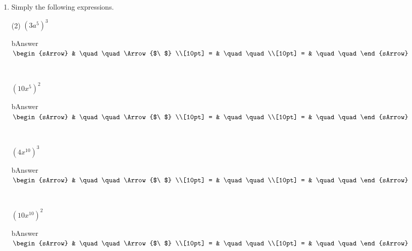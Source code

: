 \clearpage
\begin{enumerate}[resume]
  \item Simply the following expressions.
  \begin{subtask}(2)
    \task[] $ (3a^5)^3  $
              \begin{envOut}[equal height group=A-Rev-1]{bAnswer}
			       $\begin{sArrow}
			             & \quad\quad       \Arrow{$\ $} \\[10pt]
                       = & \quad\quad               \\[10pt]      
					   = & \quad\quad  
	                \end{sArrow}$
              \end{envOut}
			  \begin{shortsolution}  
			     $ \quad \quad \quad \quad$
			\end{shortsolution}	
    \task[] $ (10x^5)^2  $
              \begin{envOut}[equal height group=A-Rev-1]{bAnswer}
			       $\begin{sArrow}
			             & \quad\quad       \Arrow{$\ $} \\[10pt]
                       = & \quad\quad               \\[10pt]      
					   = & \quad\quad  
	                \end{sArrow}$
              \end{envOut}
			  \begin{shortsolution}  
			     $ \quad \quad \quad \quad$
			\end{shortsolution}	
    \task[] $ (4x^{10})^3  $
              \begin{envOut}[equal height group=A-Rev-1]{bAnswer}
			       $\begin{sArrow}
			             & \quad\quad       \Arrow{$\ $} \\[10pt]
                       = & \quad\quad               \\[10pt]      
					   = & \quad\quad  
	                \end{sArrow}$
              \end{envOut}
			  \begin{shortsolution}  
			     $ \quad \quad \quad \quad$
			\end{shortsolution}	
    \task[] $ (10x^{10})^2  $
              \begin{envOut}[equal height group=A-Rev-1]{bAnswer}
			       $\begin{sArrow}
			             & \quad\quad       \Arrow{$\ $} \\[10pt]
                       = & \quad\quad               \\[10pt]      
					   = & \quad\quad  
	                \end{sArrow}$
              \end{envOut}
			  \begin{shortsolution}  
			     $ \quad \quad \quad \quad$
			\end{shortsolution}	   \end{subtask}   			
\end{enumerate}

